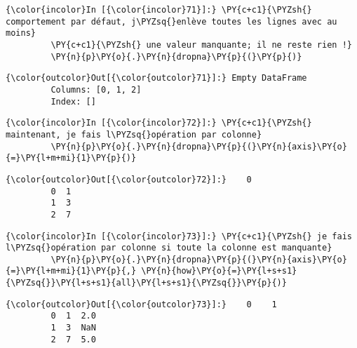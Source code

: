     \begin{Verbatim}[commandchars=\\\{\},frame=single,framerule=0.3mm,rulecolor=\color{cellframecolor}]
{\color{incolor}In [{\color{incolor}71}]:} \PY{c+c1}{\PYZsh{} comportement par défaut, j\PYZsq{}enlève toutes les lignes avec au moins}
         \PY{c+c1}{\PYZsh{} une valeur manquante; il ne reste rien !}
         \PY{n}{p}\PY{o}{.}\PY{n}{dropna}\PY{p}{(}\PY{p}{)}
\end{Verbatim}


\begin{Verbatim}[commandchars=\\\{\},frame=single,framerule=0.3mm,rulecolor=\color{cellframecolor}]
{\color{outcolor}Out[{\color{outcolor}71}]:} Empty DataFrame
         Columns: [0, 1, 2]
         Index: []
\end{Verbatim}
            
    \begin{Verbatim}[commandchars=\\\{\},frame=single,framerule=0.3mm,rulecolor=\color{cellframecolor}]
{\color{incolor}In [{\color{incolor}72}]:} \PY{c+c1}{\PYZsh{} maintenant, je fais l\PYZsq{}opération par colonne}
         \PY{n}{p}\PY{o}{.}\PY{n}{dropna}\PY{p}{(}\PY{n}{axis}\PY{o}{=}\PY{l+m+mi}{1}\PY{p}{)}
\end{Verbatim}


\begin{Verbatim}[commandchars=\\\{\},frame=single,framerule=0.3mm,rulecolor=\color{cellframecolor}]
{\color{outcolor}Out[{\color{outcolor}72}]:}    0
         0  1
         1  3
         2  7
\end{Verbatim}
            
    \begin{Verbatim}[commandchars=\\\{\},frame=single,framerule=0.3mm,rulecolor=\color{cellframecolor}]
{\color{incolor}In [{\color{incolor}73}]:} \PY{c+c1}{\PYZsh{} je fais l\PYZsq{}opération par colonne si toute la colonne est manquante}
         \PY{n}{p}\PY{o}{.}\PY{n}{dropna}\PY{p}{(}\PY{n}{axis}\PY{o}{=}\PY{l+m+mi}{1}\PY{p}{,} \PY{n}{how}\PY{o}{=}\PY{l+s+s1}{\PYZsq{}}\PY{l+s+s1}{all}\PY{l+s+s1}{\PYZsq{}}\PY{p}{)}
\end{Verbatim}


\begin{Verbatim}[commandchars=\\\{\},frame=single,framerule=0.3mm,rulecolor=\color{cellframecolor}]
{\color{outcolor}Out[{\color{outcolor}73}]:}    0    1
         0  1  2.0
         1  3  NaN
         2  7  5.0
\end{Verbatim}
            
